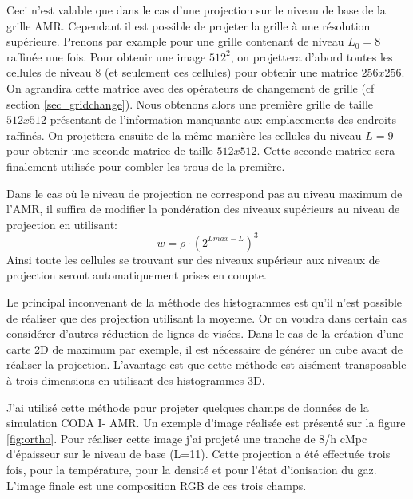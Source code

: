 Ceci n'est valable que dans le cas d'une projection sur le niveau de base de la grille \ac{AMR}.
Cependant il est possible de projeter la grille à une résolution supérieure.
Prenons par example pour une grille contenant de niveau $L_{0}=8$ raffinée une fois.
Pour obtenir une image $512^2$, on projettera d'abord toutes les cellules de niveau 8 (et seulement ces cellules) pour obtenir une matrice $256x256$.
On agrandira cette matrice avec des opérateurs de changement de grille (cf section \ref{sec_gridchange}).
Nous obtenons alors une première grille de taille $512x512$ présentant de l'information manquante aux emplacements des endroits raffinés.
On projettera ensuite de la même manière les cellules du niveau $L=9$ pour obtenir une seconde matrice de taille $512x512$.
Cette seconde matrice sera finalement utilisée pour combler les trous de la première.

Dans le cas où le niveau de projection ne correspond pas au niveau maximum de l'\ac{AMR}, il suffira de modifier la pondération des niveaux supérieurs au niveau de projection en utilisant:
\begin{equation}
w = \rho \cdot \left( 2^{Lmax-L} \right)^3
\end{equation}
Ainsi toute les cellules se trouvant sur des niveaux supérieur aux niveaux de projection seront automatiquement prises en compte.

Le principal inconvenant de la méthode des histogrammes est qu'il n'est possible de réaliser que des projection utilisant la moyenne.
Or on voudra dans certain cas considérer d'autres réduction de lignes de visées.
Dans le cas de la création d'une carte 2D de maximum par exemple, il est nécessaire de générer un cube avant de réaliser la projection.
L'avantage est que cette méthode est aisément transposable à trois dimensions en utilisant des histogrammes 3D.




J'ai utilisé cette méthode pour projeter quelques champs de données de la simulation CODA I- AMR.
Un exemple d'image réalisée est présenté sur la figure \ref{fig:ortho}.
Pour réaliser cette image j'ai projeté une tranche de 8/h cMpc d'épaisseur sur le niveau de base (L=11).
Cette projection a été effectuée trois fois, pour la température, pour la densité et pour l'état d'ionisation du gaz.
L'image finale est une composition RGB de ces trois champs.

